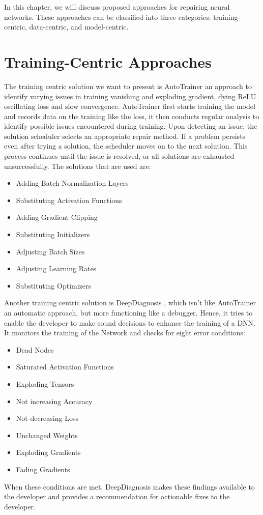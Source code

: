 In this chapter, we will discuss proposed approaches for repairing neural networks.
These approaches \cite{nakagawa_experience_2023} can be classified into three categories: training-centric, data-centric, and model-centric.

\section{Training-Centric Approaches}\label{sec:training-centric-approaches}
The training centric solution we want to present is AutoTrainer \cite{zhang_autotrainer_2021} an approach to identify varying issues in training vanishing and exploding gradient, dying ReLU oscillating loss and slow convergence.
AutoTrainer first starts training the model and records data on the training like the loss, it then conducts regular analysis to identify possible issues encountered during training.
Upon detecting an issue, the solution scheduler selects an appropriate repair method.
If a problem persists even after trying a solution, the scheduler moves on to the next solution.
This process continues until the issue is resolved, or all solutions are exhausted unsuccessfully.
The solutions that are used are:
\begin{itemize}
    \item Adding Batch Normalization Layers
    \item Substituting Activation Functions
    \item Adding Gradient Clipping
    \item Substituting Initializers
    \item Adjusting Batch Sizes
    \item Adjusting Learning Rates
    \item Substituting Optimizers
\end{itemize}
Another training centric solution is DeepDiagnosis \cite{wardat_deepdiagnosis_2021}, which isn't like AutoTrainer an automatic approach, but more functioning like a debugger.
Hence, it tries to enable the developer to make sound decisions to enhance the training of a DNN\@.
It monitors the training of the Network and checks for eight error conditions:
\begin{itemize}
    \item Dead Nodes
    \item Saturated Activation Functions
    \item Exploding Tensors
    \item Not increasing Accuracy
    \item Not decreasing Loss
    \item Unchanged Weights
    \item Exploding Gradients
    \item Fading Gradients
\end{itemize}
When these conditions are met, DeepDiagnosis makes these findings available to the developer and provides a recommendation for actionable fixes to the developer.
